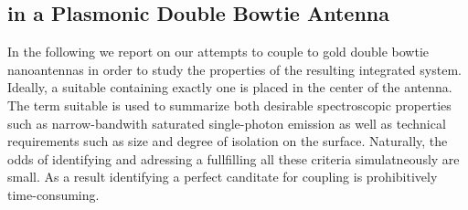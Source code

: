 %
%
%

	\subsection{\siv in a Plasmonic Double Bowtie Antenna}

		In the following we report on our attempts to couple \sivs to gold double bowtie nanoantennas in order to study the properties of the resulting integrated system. Ideally, a suitable \nd containing exactly one \siv is placed in the center of the antenna. The term suitable is used to summarize both desirable spectroscopic properties such as narrow-bandwith saturated single-photon emission as well as technical requirements such as \nd size and degree of isolation on the surface. Naturally, the odds of identifying and adressing a \nd fullfilling all these criteria simulatneously are small. As a result identifying a perfect canditate for coupling is prohibitively time-consuming.

